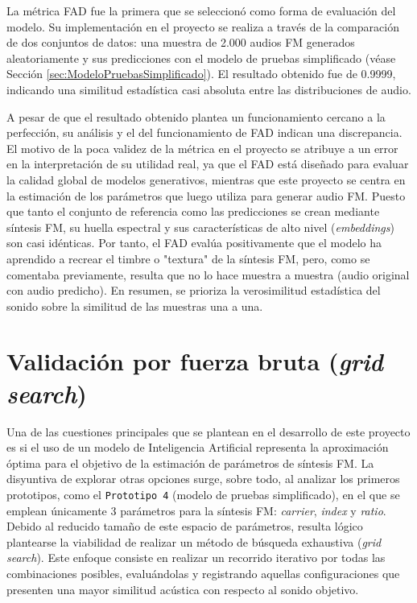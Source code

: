 La métrica FAD fue la primera que se seleccionó como forma de evaluación del modelo. Su implementación en el proyecto se realiza a través de la comparación de dos conjuntos de datos: una muestra de 2.000 audios FM generados aleatoriamente
y sus predicciones con el modelo de pruebas simplificado (véase Sección \ref{sec:ModeloPruebasSimplificado}). El resultado obtenido fue de 0.9999, indicando una similitud estadística casi absoluta entre las distribuciones de audio.

A pesar de que el resultado obtenido plantea un funcionamiento cercano a la perfección, su análisis y el del funcionamiento de FAD indican una discrepancia. 
El motivo de la poca validez de la métrica en el proyecto se atribuye a un error en la interpretación de su 
utilidad real, ya que el FAD está diseñado para evaluar la calidad global de modelos generativos, mientras que este proyecto se centra 
en la estimación de los parámetros que luego utiliza para generar audio FM. 
Puesto que tanto el conjunto de referencia como las predicciones se crean mediante síntesis FM, su huella espectral y sus características de alto nivel (\textit{embeddings})
son casi idénticas. Por tanto, el FAD evalúa positivamente que el modelo ha aprendido a recrear el timbre o "textura" de 
la síntesis FM, pero, como se comentaba previamente, resulta que no lo hace muestra a muestra (audio original con audio predicho). En resumen, se prioriza la 
verosimilitud estadística del sonido sobre la similitud de las muestras una a una.

\section{Validación por fuerza bruta (\textit{grid search})}
\label{sec:gridSearch}
Una de las cuestiones principales que se plantean en el desarrollo de este proyecto es si el uso de un modelo de Inteligencia Artificial representa
la aproximación óptima para el objetivo de la estimación de parámetros de síntesis FM. La disyuntiva de explorar otras opciones surge, sobre todo, al analizar los primeros prototipos, 
como el \texttt{Prototipo 4} (modelo de pruebas simplificado), en el que se emplean únicamente 3 parámetros para la síntesis FM: \textit{carrier}, \textit{index} y \textit{ratio}.
Debido al reducido tamaño de este espacio de parámetros, resulta lógico plantearse la viabilidad de realizar un método de búsqueda exhaustiva 
(\textit{grid search}). Este enfoque consiste en realizar un recorrido iterativo por todas las combinaciones posibles, evaluándolas y registrando 
aquellas configuraciones que presenten una mayor similitud acústica con
respecto al sonido objetivo.

